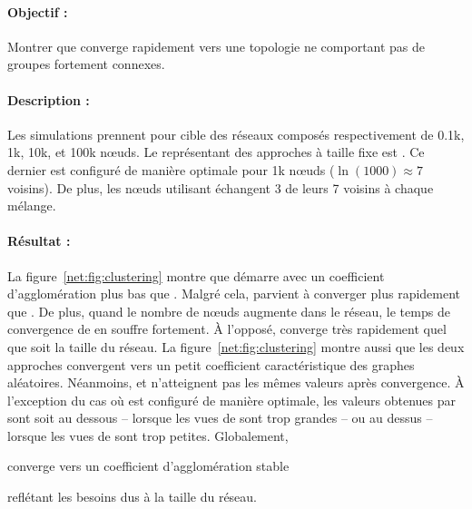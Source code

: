 \paragraph{Objectif :} Montrer que \SPRAY converge rapidement vers une topologie
ne comportant pas de groupes fortement connexes.

\paragraph{Description :} Les simulations prennent pour cible des réseaux
composés respectivement de 0.1k, 1k, 10k, et 100k nœuds. Le représentant des
approches à taille fixe est \CYCLON. Ce dernier est configuré de manière
optimale pour 1k nœuds ($\ln(1000)\approx 7$ voisins). De plus, les nœuds
utilisant \CYCLON échangent 3 de leurs 7 voisins à chaque mélange.

\paragraph{Résultat :} La figure~\ref{net:fig:clustering} montre que \CYCLON
démarre avec un coefficient d'agglomération plus bas que \SPRAY. Malgré cela,
\SPRAY parvient à converger plus rapidement que \CYCLON. De plus, quand le
nombre de nœuds augmente dans le réseau, le temps de convergence de \CYCLON en
souffre fortement. À l'opposé, \SPRAY converge très rapidement quel que soit la
taille du réseau. La figure~\ref{net:fig:clustering} montre aussi que les deux
approches convergent vers un petit coefficient caractéristique des graphes
aléatoires. Néanmoins, \CYCLON et \SPRAY n'atteignent pas les mêmes valeurs
après convergence. À l'exception du cas où \CYCLON est configuré de manière
optimale, les valeurs obtenues par \SPRAY sont soit au dessous -- lorsque les
vues de \CYCLON sont trop grandes -- ou au dessus -- lorsque les vues de \CYCLON
sont trop petites. Globalement, \SPRAY
\begin{inparaenum}[(i)]
\item converge vers un coefficient d'agglomération stable
\item reflétant les besoins dus à la taille du réseau.
\end{inparaenum}
